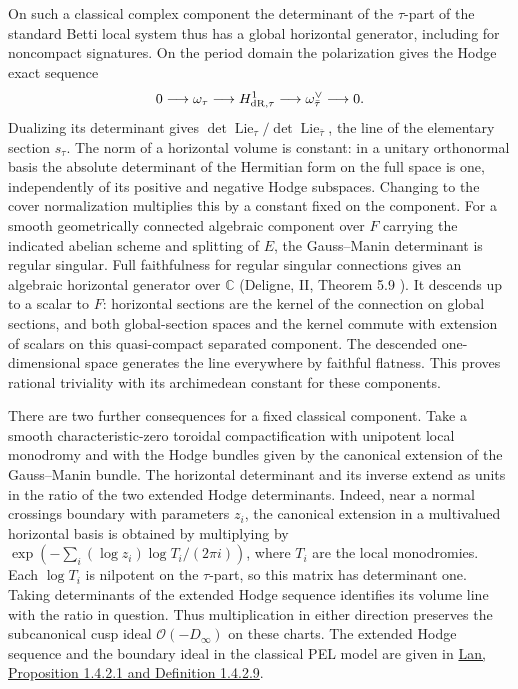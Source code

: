 On such a classical complex component the determinant of the
\(\tau\)-part of the standard Betti local system thus has a global
horizontal generator, including for noncompact signatures. On the
period domain the polarization gives the Hodge exact sequence
\[
 0\longrightarrow\omega_\tau\longrightarrow
 H^1_{\rm dR,\tau}\longrightarrow\omega_{\bar\tau}^{\vee}
 \longrightarrow0.
\]
Dualizing its determinant gives
\(\det\operatorname{Lie}_\tau/\det\operatorname{Lie}_{\bar\tau}\),
the line of the elementary section \(s_\tau\).
The norm of a horizontal volume is constant: in a unitary
orthonormal basis the absolute determinant of the Hermitian form
on the full space is one, independently of its positive and
negative Hodge subspaces. Changing to the cover normalization
multiplies this by a constant fixed on the component.
For a smooth geometrically connected algebraic component over
\(F\) carrying the indicated abelian scheme and splitting of \(E\),
the Gauss--Manin determinant is regular singular. Full faithfulness
for regular singular connections gives an algebraic horizontal
generator over \(\mathbb C\) (Deligne, II, Theorem 5.9
\cite{deligne-reg-sing}). It descends up to a scalar to \(F\):
horizontal sections are the kernel of the connection on global
sections, and both global-section spaces and the kernel commute
with extension of scalars on this quasi-compact separated
component. The descended one-dimensional space generates the
line everywhere by faithful flatness. This proves rational
triviality with its archimedean constant for these components.

There are two further consequences for a fixed classical component.
Take a smooth characteristic-zero toroidal compactification with
unipotent local monodromy and with the Hodge bundles given by the
canonical extension of the Gauss--Manin bundle. The horizontal
determinant and its inverse extend as units in the ratio of
the two extended Hodge determinants. Indeed, near a normal
crossings boundary with parameters \(z_i\), the canonical
extension in a multivalued horizontal basis is obtained by
multiplying by
\(\exp(-\sum_i(\log z_i)\log T_i/(2\pi i))\), where \(T_i\)
are the local monodromies. Each \(\log T_i\) is nilpotent on
the \(\tau\)-part, so this matrix has determinant one. Taking
determinants of the extended Hodge sequence identifies its
volume line with the ratio in question. Thus multiplication
in either direction preserves the subcanonical cusp ideal
\(\mathcal O(-D_\infty)\) on these charts. The extended Hodge
sequence and the boundary ideal in the classical PEL model are
given in \href{https://www-users.math.umn.edu/~kwlan/articles/cpt-ram-ord.pdf}
{Lan, Proposition 1.4.2.1 and Definition 1.4.2.9}.

